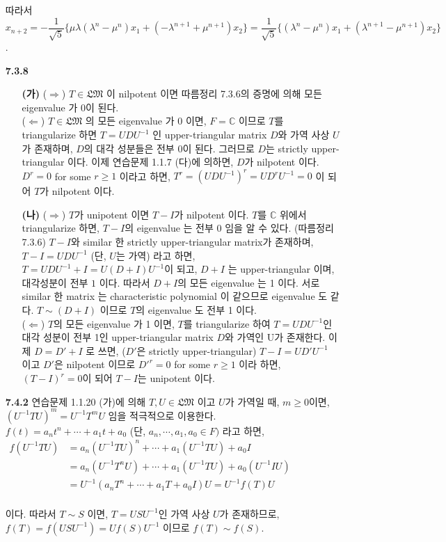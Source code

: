 \documentclass{article}
\begin{document}
\begin{itemize}
따라서 $x_{n+2} = -\dfrac{1}{\sqrt{5}}\{\mu\lambda (\lambda^n-\mu^n) x_1 + (-\lambda^{n+1} + \mu^{n+1}) x_2 \} = \dfrac{1}{\sqrt{5}}\{(\lambda^n-\mu^n) x_1 + (\lambda^{n+1} - \mu^{n+1}) x_2 \}$.

\item[\textbf{7.3.8}]
	\begin{itemize}
		\item[\textbf{(가)}] ($\Rightarrow$) $T\in\mathfrak{LM}$ 이 nilpotent 이면 따름정리 7.3.6의 증명에 의해 모든 eigenvalue 가 $0$이 된다.\\ ($\Leftarrow$) $T\in\mathfrak{LM}$ 의 모든 eigenvalue 가 $0$ 이면, $F=\mathbb{C}$ 이므로 $T$를 triangularize 하면 $T = UDU^{-1}$ 인 upper-triangular matrix $D$와 가역 사상 $U$가 존재하며, $D$의 대각 성분들은 전부 0이 된다. 그러므로 $D$는 strictly upper-triangular 이다. 이제 연습문제 1.1.7 (다)에 의하면, $D$가 nilpotent 이다. $D^r = 0$ for some $r\geq 1$ 이라고 하면, $T^r = (UDU^{-1})^r = UD^rU^{-1} = 0$ 이 되어 $T$가 nilpotent 이다. 
		\item[\textbf{(나)}] ($\Rightarrow$) $T$가 unipotent 이면 $T-I$가 nilpotent 이다. $T$를 $\mathbb{C}$ 위에서 triangularize 하면, $T-I$의 eigenvalue 는 전부 0 임을 알 수 있다. (따름정리 7.3.6) $T-I$와 similar 한 strictly upper-triangular matrix가 존재하며, $T-I = UDU^{-1}$ (단, $U$는 가역) 라고 하면, $T = UDU^{-1} + I = U(D+I)U^{-1}$이 되고, $D+I$ 는 upper-triangular 이며, 대각성분이 전부 $1$ 이다. 따라서 $D+I$의 모든 eigenvalue 는 1 이다. 서로 similar 한 matrix 는 characteristic polynomial 이 같으므로 eigenvalue 도 같다. $T \sim (D+I)$ 이므로 $T$의 eigenvalue 도 전부 1 이다. 
		\\ ($\Leftarrow$) $T$의 모든 eigenvalue 가 1 이면, $T$를 triangularize 하여 $T = UDU^{-1}$인 대각 성분이 전부 1인 upper-triangular matrix $D$와 가역인 U가 존재한다. 이제 $D = D'+I$ 로 쓰면, ($D'$은 strictly upper-triangular) $T-I = UD'U^{-1}$ 이고 $D'$은 nilpotent 이므로 $D'^r = 0$ for some $r\geq 1$ 이라 하면, $(T-I)^r = 0$이 되어 $T-I$는 unipotent 이다.
	\end{itemize}

\item[\textbf{7.4.2}] 연습문제 1.1.20 (가)에 의해 $T, U\in \mathfrak{LM}$ 이고 $U$가 가역일 때, $m\geq 0$이면, $(U^{-1}TU)^m = U^{-1}T^mU$ 임을 적극적으로 이용한다.
$f(t) = a_nt^n + \cdots + a_1t+a_0$ (단, $a_n, \cdots, a_1, a_0 \in F)$ 라고 하면,  \\$\begin{aligned}
f(U^{-1}TU) &= a_n(U^{-1}TU)^n + \cdots + a_1(U^{-1}TU) + a_0I \\
	&= a_n(U^{-1}T^nU) + \cdots + a_1(U^{-1}TU) + a_0(U^{-1}IU)\\
	&= U^{-1}(a_nT^n + \cdots + a_1T + a_0I)U = U^{-1}f(T)U
\end{aligned}$\\\\
이다. 따라서 $T \sim S$ 이면, $T = USU^{-1}$인 가역 사상 $U$가 존재하므로, $f(T) = f(USU^{-1}) = Uf(S)U^{-1}$ 이므로 $f(T) \sim f(S)$.
 

\end{itemize}
\end{document}

